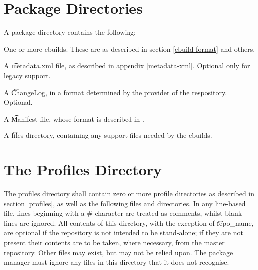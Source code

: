 
\section{Package Directories}
\label{package-dirs}

A package directory contains the following:
\begin{bulletlist}
\item One or more ebuilds. These are as described in section \ref{ebuild-format} and others.
\item A \t{metadata.xml} file, as described in appendix \ref{metadata-xml}. Optional only for
    legacy support.
\item A \t{ChangeLog}, in a format determined by the provider of the respository. Optional.
\item A \t{Manifest} file, whose format is described in \cite{Glep44}.
\item A \t{files} directory, containing any support files needed by the ebuilds.
\end{bulletlist}


\section{The Profiles Directory}
\label{profiles-dir}

The profiles directory shall contain zero or more profile directories as described in section
\ref{profiles}, as well as the following files and directories. In any line-based file, lines
beginning with a \# character are treated as comments, whilst blank lines are ignored. All contents
of this directory, with the exception of \t{repo\_name}, are optional if the repository is not
intended to be stand-alone; if they are not present their contents are to be taken, where necessary,
from the master repository. Other files may exist, but may not be relied upon. The package manager
must ignore any files in this directory that it does not recognise.

